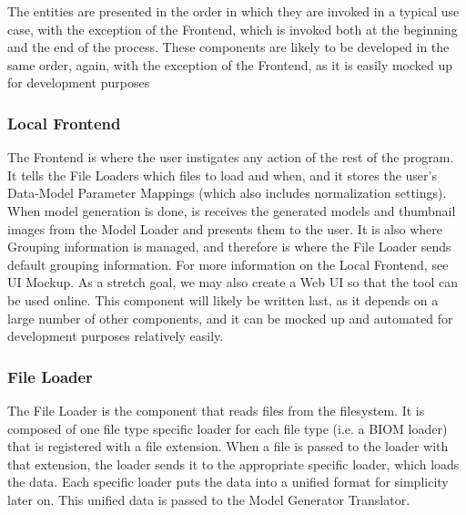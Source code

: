 \documentclass[letterpaper,10pt, onecolumn, draftclsnofoot]{IEEEtran}
\begin{document}
The entities are presented in the order in which they are invoked in a typical use case, with the exception of the Frontend, which is invoked both at the beginning and the end of the process. These components are likely to be developed in the same order, again, with the exception of the Frontend, as it is easily mocked up for development purposes

\subsubsection{Local Frontend}
The Frontend is where the user instigates any action of the rest of the program. It tells the File Loaders which files to load and when, and it stores the user's Data-Model Parameter Mappings (which also includes normalization settings). When model generation is done, is receives the generated models and thumbnail images from the Model Loader and presents them to the user. It is also where Grouping information is managed, and therefore is where the File Loader sends default grouping information. For more information on the Local Frontend, see UI Mockup. As a stretch goal, we may also create a Web UI so that the tool can be used online. This component will likely be written last, as it depends on a large number of other components, and it can be mocked up and automated for development purposes relatively easily.

\subsubsection{File Loader}
The File Loader is the component that reads files from the filesystem. It is composed of one file type specific loader for each file type (i.e. a BIOM loader) that is registered with a file extension. When a file is passed to the loader with that extension, the loader sends it to the appropriate specific loader, which loads the data. Each specific loader puts the data into a unified format for simplicity later on. This unified data is passed to the Model Generator Translator. 
\end{document}
